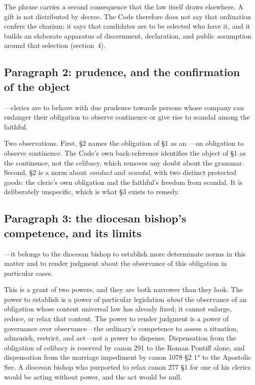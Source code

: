 The phrase  carries a second consequence that the law itself draws elsewhere. A gift is not distributed by decree. The Code therefore does not say that ordination confers the charism; it says that candidates are to be selected who have it, and it builds an elaborate apparatus of discernment, declaration, and public assumption around that selection (section~4).

\subsection{Paragraph 2: prudence, and the confirmation of the object}

---clerics are to behave with due prudence towards persons whose company can endanger their obligation to observe continence or give rise to scandal among the faithful.

Two observations. First, §2 names the obligation of §1 as an ---an obligation to observe continence. The Code's own back-reference identifies the object of §1 as the continence, not the celibacy, which removes any doubt about the grammar. Second, §2 is a norm about \emph{conduct} and \emph{scandal}, with two distinct protected goods: the cleric's own obligation and the faithful's freedom from scandal. It is deliberately unspecific, which is what §3 exists to remedy.

\subsection{Paragraph 3: the diocesan bishop's competence, and its limits}

---it belongs to the diocesan bishop to establish more determinate norms in this matter and to render judgment about the observance of this obligation in particular cases.

This is a grant of two powers, and they are both narrower than they look. The power to establish  is a power of particular legislation \emph{about} the observance of an obligation whose content universal law has already fixed; it cannot enlarge, reduce, or relax that content. The power to render judgment  is a power of governance over observance---the ordinary's competence to assess a situation, admonish, restrict, and act---not a power to dispense. Dispensation from the obligation of celibacy is reserved by canon 291 to the Roman Pontiff alone, and dispensation from the marriage impediment by canon 1078 §2 1° to the Apostolic See. A diocesan bishop who purported to relax canon 277 §1 for one of his clerics would be acting without power, and the act would be null.

